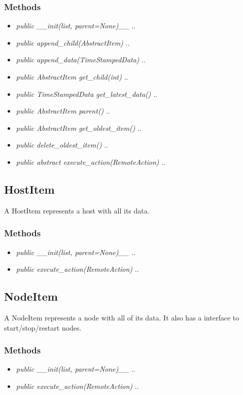 \subsubsection{Methods}
\begin{itemize}
  \item \textit{public \_\_init(list, parent=None)\_\_}
  ..
  \item \textit{public append\_child(AbstractItem)}
  ..
  \item \textit{public append\_data(TimeStampedData)}
  ..
  \item \textit{public AbstractItem get\_child(int)}
  ..
  \item \textit{public TimeStampedData get\_latest\_data()}
  ..
  \item \textit{public AbstractItem parent()}
  ..
  \item \textit{public AbstractItem get\_oldest\_item()}
  ..
  \item \textit{public delete\_oldest\_item()}
  ..
  \item \textit{public abstract execute\_action(RemoteAction)}
  ..  
\end{itemize}

\subsection{HostItem}
A HostItem represents a host with all its data.
\subsubsection{Methods}
\begin{itemize}
  \item \textit{public \_\_init(list, parent=None)\_\_}
  ..
  \item \textit{public execute\_action(RemoteAction)}
  ..
\end{itemize}

\subsection{NodeItem}
 A NodeItem represents a node with all of its data. It also has a interface to start/stop/restart nodes.
\subsubsection{Methods}
\begin{itemize}
  \item \textit{public \_\_init(list, parent=None)\_\_}
  ..
  \item \textit{public execute\_action(RemoteAction)}
  ..
\end{itemize}

